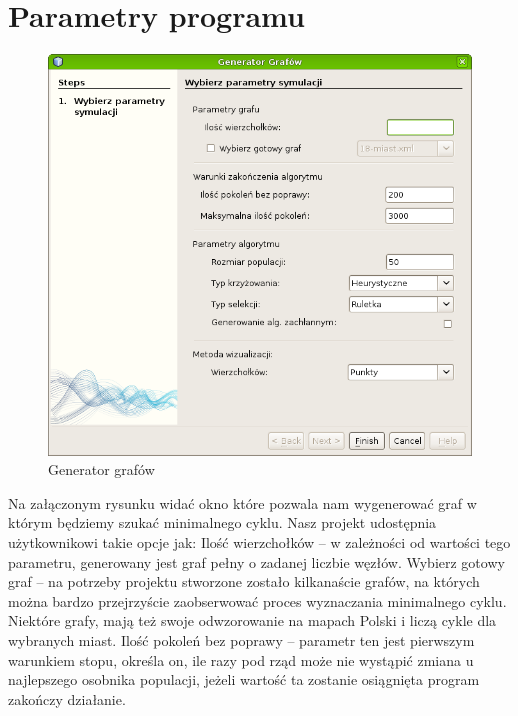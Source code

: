 \documentclass[a4paper]{article}
\begin{document}
\section{Parametry programu}
\begin{figure}[phb]
 \centering
 \includegraphics[width=\textwidth ]{wizard.png}
 \caption{Generator grafów}
\end{figure}

Na załączonym rysunku widać okno które pozwala nam wygenerować graf w którym będziemy szukać minimalnego cyklu. Nasz projekt udostępnia użytkownikowi takie opcje jak:
Ilość wierzchołków – w zależności od wartości tego parametru, generowany jest graf pełny o zadanej liczbie węzłów.
Wybierz gotowy graf – na potrzeby projektu stworzone zostało kilkanaście grafów, na których można bardzo przejrzyście zaobserwować proces wyznaczania minimalnego cyklu. Niektóre grafy, mają też swoje odwzorowanie na mapach Polski i liczą cykle dla wybranych miast.
Ilość pokoleń bez poprawy – parametr ten jest pierwszym warunkiem stopu, określa on, ile razy pod rząd może nie wystąpić zmiana u najlepszego osobnika populacji, jeżeli wartość ta zostanie osiągnięta program zakończy działanie.
\end{document}

